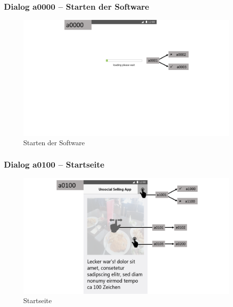 \documentclass[a4paper,12pt,oneside]{scrartcl}
\begin{document}
\subsubsection{Dialog a0000 – Starten der Software}
\begin{figure}[!htbp]
\centering
\noindent\includegraphics[width=\linewidth,height=\textheight,keepaspectratio]{Dialoge/a0000}
\caption{Starten der Software}
\end{figure}
\FloatBarrier

\subsubsection{Dialog a0100 – Startseite}
\begin{figure}[!htbp]
\centering
\noindent\includegraphics[width=\linewidth,height=\textheight,keepaspectratio]{Dialoge/a0100}
\caption{Startseite}
\end{figure}
\FloatBarrier
\end{document}
